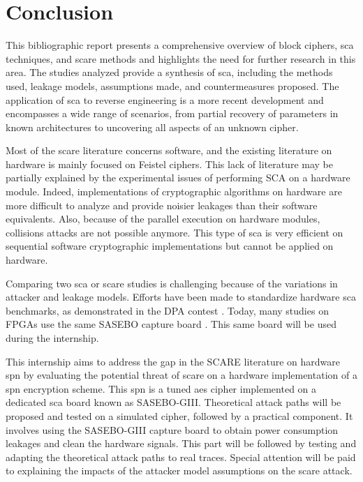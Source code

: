 \documentclass[11pt]{sdm}
\begin{document}



\section{Conclusion}

This bibliographic report presents a comprehensive overview of block ciphers, \gls{sca} techniques, and \gls{scare} methods and highlights the need for further research in this area.
The studies analyzed provide a synthesis of \gls{sca}, including the methods used, leakage models, assumptions made, and countermeasures proposed.
The application of \gls{sca} to reverse engineering is a more recent development and encompasses a wide range of scenarios, from partial recovery of parameters in known architectures to uncovering all aspects of an unknown cipher.

Most of the \gls{scare} literature concerns software, and the existing literature on hardware is mainly focused on Feistel ciphers.
This lack of literature may be partially explained by the experimental issues of performing SCA on a hardware module.
Indeed, implementations of cryptographic algorithms on hardware are more difficult to analyze and provide noisier leakages than their software equivalents.
Also, because of the parallel execution on hardware modules, collisions attacks are not possible anymore.
This type of \gls{sca} is very efficient on sequential software cryptographic implementations but cannot be applied on hardware.

Comparing two \gls{sca} or \gls{scare} studies is challenging because of the variations in attacker and leakage models.  
Efforts have been made to standardize hardware \gls{sca} benchmarks, as demonstrated in the DPA contest \parencite{Clavier_Danger_Duc_Elaabid_Gérard_Guilley_Heuser_Kasper_Li_Lomné_et_al_2014}.
Today, many studies on FPGAs use the same SASEBO capture board \parencite{Satoh}.
This same board will be used during the internship.

This internship aims to address the gap in the SCARE literature on hardware \gls{spn} by evaluating the potential threat of \gls{scare} on a hardware implementation of a \gls{spn} encryption scheme.
This \gls{spn} is a tuned \gls{aes} cipher implemented on a dedicated \gls{sca} board known as SASEBO-GIII.
Theoretical attack paths will be proposed and tested on a simulated cipher, followed by a practical component.
It involves using the SASEBO-GIII capture board to obtain power consumption leakages and clean the hardware signals.
This part will be followed by testing and adapting the theoretical attack paths to real traces.
Special attention will be paid to explaining the impacts of the attacker model assumptions on the \gls{scare} attack.





\printbibliography[title=Bibliographie]
\end{document}
